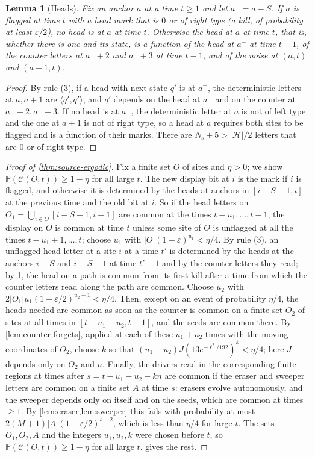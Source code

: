 \documentclass[11pt]{article}
\theoremstyle{plain}
\newtheorem{lemma}[theorem]{Lemma}
\theoremstyle{definition}
\theoremstyle{remark}
\newcommand{\Prob}{\mathbb P}
\newcommand{\eps}{\varepsilon}
\newcommand{\Lh}[1]{\langle #1}
\newcommand{\Rh}[1]{#1\rangle}
\newcommand{\Hs}{\mathcal H}
\begin{document}
\begin{lemma}[Heads]\label{lem:heads}
Fix an anchor $a$ at a time $t\ge1$ and let $a^-=a-S$. If $a$ is flagged at time $t$ with a head mark that is $0$ or of right type (a \emph{kill}, of probability at least $\eps/2$), no head is at $a$ at time $t$. Otherwise the head at $a$ at time $t$, that is, whether there is one and its state, is a function of the head at $a^-$ at time $t-1$, of the counter letters at $a^-+2$ and $a^-+3$ at time $t-1$, and of the noise at $(a,t)$ and $(a+1,t)$.
\end{lemma}

\begin{proof}
By rule (3), if a head with next state $q'$ is at $a^-$, the deterministic letters at $a,a+1$ are $\Lh{q'},\Rh{q'}$, and $q'$ depends on the head at $a^-$ and on the counter at $a^-+2,a^-+3$. If no head is at $a^-$, the deterministic letter at $a$ is not of left type and the one at $a+1$ is not of right type, so a head at $a$ requires both sites to be flagged and is a function of their marks. There are $N_{\mathrm s}+5>|\Hs|/2$ letters that are $0$ or of right type.
\end{proof}

\begin{proof}[Proof of \cref{thm:source-ergodic}]
Fix a finite set $O$ of sites and $\eta>0$; we show $\Prob(\mathcal C(O,t))\ge1-\eta$ for all large $t$. The new display bit at $i$ is the mark if $i$ is flagged, and otherwise it is determined by the heads at anchors in $[i-S+1,i]$ at the previous time and the old bit at $i$. So if the head letters on $O_1=\bigcup_{i\in O}[i-S+1,i+1]$ are common at the times $t-u_1,\dots,t-1$, the display on $O$ is common at time $t$ unless some site of $O$ is unflagged at all the times $t-u_1+1,\dots,t$; choose $u_1$ with $|O|(1-\eps)^{u_1}<\eta/4$. By rule (3), an unflagged head letter at a site $i$ at a time $t'$ is determined by the heads at the anchors $i-S$ and $i-S-1$ at time $t'-1$ and by the counter letters they read; by \cref{lem:heads}, the head on a path is common from its first kill after a time from which the counter letters read along the path are common. Choose $u_2$ with $2|O_1|u_1(1-\eps/2)^{u_2-1}<\eta/4$. Then, except on an event of probability $\eta/4$, the heads needed are common as soon as the counter is common on a finite set $O_2$ of sites at all times in $[t-u_1-u_2,t-1]$, and the seeds are common there. By \cref{lem:counter-forgets}, applied at each of these $u_1+u_2$ times with the moving coordinates of $O_2$, choose $k$ so that $(u_1+u_2)J(13e^{-\ell^2/192})^k<\eta/4$; here $J$ depends only on $O_2$ and $n$. Finally, the drivers read in the corresponding finite regions at times after $s=t-u_1-u_2-kn$ are common if the eraser and sweeper letters are common on a finite set $A$ at time $s$: erasers evolve autonomously, and the sweeper depends only on itself and on the seeds, which are common at times $\ge1$. By \cref{lem:eraser,lem:sweeper} this fails with probability at most $2(M+1)|A|(1-\eps/2)^{s-2}$, which is less than $\eta/4$ for large $t$. The sets $O_1,O_2,A$ and the integers $u_1,u_2,k$ were chosen before $t$, so $\Prob(\mathcal C(O,t))\ge1-\eta$ for all large $t$.  gives the rest.
\end{proof}
\end{document}

